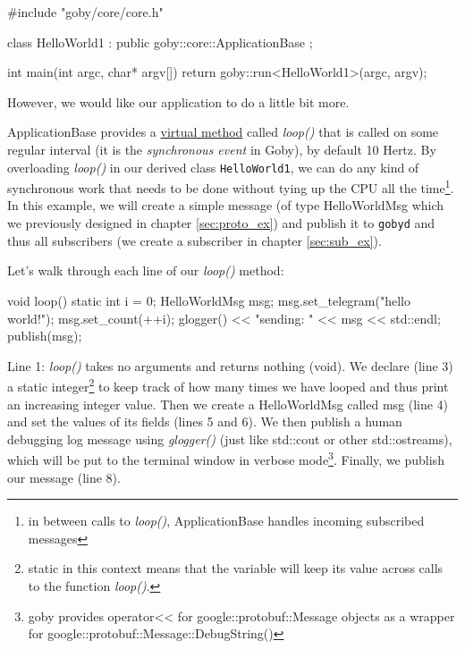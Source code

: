 \documentclass[11pt, letterpaper, oneside]{memoir}
\begin{document}
\begin{boxedverbatim}
#include "goby/core/core.h"

class HelloWorld1 : public goby::core::ApplicationBase {};

int main(int argc, char* argv[])
{   
    return goby::run<HelloWorld1>(argc, argv);
}
\end{boxedverbatim}
\resetbvlinenumber

However, we would like our application to do a little bit more.

ApplicationBase provides a \href{http://www.cplusplus.com/doc/tutorial/polymorphism/}{virtual method} called \textit{loop()} that is called on some regular interval (it is the \textit{synchronous event} in Goby), by default 10 Hertz. By overloading \textit{loop()} in our derived class \verb|HelloWorld1|, we can do any kind of synchronous work that needs to be done without tying up the CPU all the time\footnote{in between calls to \textit{loop()}, ApplicationBase handles incoming subscribed messages}. In this example, we will create a simple message (of type HelloWorldMsg which we previously designed in chapter \ref{sec:proto_ex}) and publish it to \verb|gobyd| and thus all subscribers (we create a subscriber in chapter \ref{sec:sub_ex}). 

Let's walk through each line of our \textit{loop()} method:

\begin{boxedverbatim}
void loop()
{
   static int i = 0;
   HelloWorldMsg msg;
   msg.set_telegram("hello world!");
   msg.set_count(++i);
   glogger() << "sending: " << msg << std::endl;
   publish(msg);
}
\end{boxedverbatim}
\resetbvlinenumber

Line 1: \textit{loop()} takes no arguments and returns nothing (void). We declare (line 3) a static integer\footnote{static in this context means that the variable will keep its value across calls to the function \textit{loop()}.} to keep track of how many times we have looped and thus print an increasing integer value. Then we create a HelloWorldMsg called msg (line 4) and set the values of its fields (lines 5 and 6). We then publish a human debugging log message using \textit{glogger()} (just like std::cout or other std::ostreams), which will be put to the terminal window in verbose mode\footnote{goby provides operator<< for google::protobuf::Message objects as a wrapper for google::protobuf::Message::DebugString()}. Finally, we publish our message (line 8).
\end{document}
